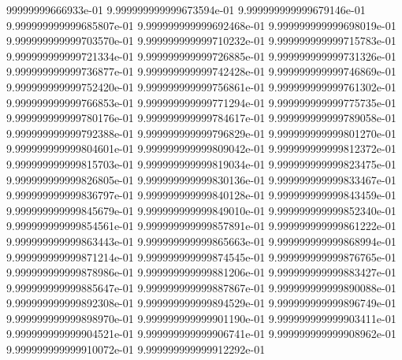 99999999666933e-01	9.999999999999673594e-01	9.999999999999679146e-01	9.999999999999685807e-01	9.999999999999692468e-01	9.999999999999698019e-01	9.999999999999703570e-01	9.999999999999710232e-01	9.999999999999715783e-01	9.999999999999721334e-01	9.999999999999726885e-01	9.999999999999731326e-01	9.999999999999736877e-01	9.999999999999742428e-01	9.999999999999746869e-01	9.999999999999752420e-01	9.999999999999756861e-01	9.999999999999761302e-01	9.999999999999766853e-01	9.999999999999771294e-01	9.999999999999775735e-01	9.999999999999780176e-01	9.999999999999784617e-01	9.999999999999789058e-01	9.999999999999792388e-01	9.999999999999796829e-01	9.999999999999801270e-01	9.999999999999804601e-01	9.999999999999809042e-01	9.999999999999812372e-01	9.999999999999815703e-01	9.999999999999819034e-01	9.999999999999823475e-01	9.999999999999826805e-01	9.999999999999830136e-01	9.999999999999833467e-01	9.999999999999836797e-01	9.999999999999840128e-01	9.999999999999843459e-01	9.999999999999845679e-01	9.999999999999849010e-01	9.999999999999852340e-01	9.999999999999854561e-01	9.999999999999857891e-01	9.999999999999861222e-01	9.999999999999863443e-01	9.999999999999865663e-01	9.999999999999868994e-01	9.999999999999871214e-01	9.999999999999874545e-01	9.999999999999876765e-01	9.999999999999878986e-01	9.999999999999881206e-01	9.999999999999883427e-01	9.999999999999885647e-01	9.999999999999887867e-01	9.999999999999890088e-01	9.999999999999892308e-01	9.999999999999894529e-01	9.999999999999896749e-01	9.999999999999898970e-01	9.999999999999901190e-01	9.999999999999903411e-01	9.999999999999904521e-01	9.999999999999906741e-01	9.999999999999908962e-01	9.999999999999910072e-01	9.999999999999912292e-01
